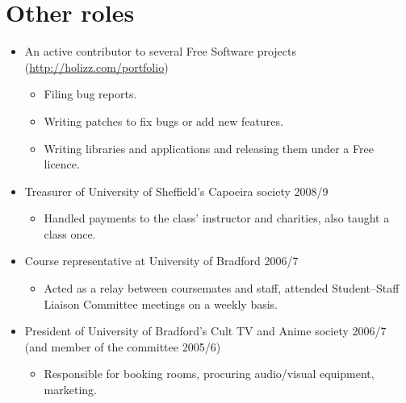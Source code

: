 \documentclass{article}
\newcommand{\iri}[1]{\url{#1}}
\begin{document}
\section{Other roles}
\begin{itemize}
\item An active contributor to several Free Software projects (\iri{http://holizz.com/portfolio})
  \begin{itemize}
  \item Filing bug reports.
  \item Writing patches to fix bugs or add new features.
  \item Writing libraries and applications and releasing them under a Free licence.
  \end{itemize}
\item Treasurer of University of Sheffield's Capoeira society 2008/9
  \begin{itemize}
  \item Handled payments to the class' instructor and charities, also taught a class once.
  \end{itemize}
\item Course representative at University of Bradford 2006/7
  \begin{itemize}
  \item Acted as a relay between coursemates and staff, attended Student--Staff Liaison Committee meetings on a weekly basis.
  \end{itemize}
\item President of University of Bradford's Cult TV and Anime society 2006/7 (and member of the committee 2005/6)
  \begin{itemize}
  \item Responsible for booking rooms, procuring audio/visual equipment, marketing.
  \end{itemize}
\end{itemize}

\break
\end{document}
